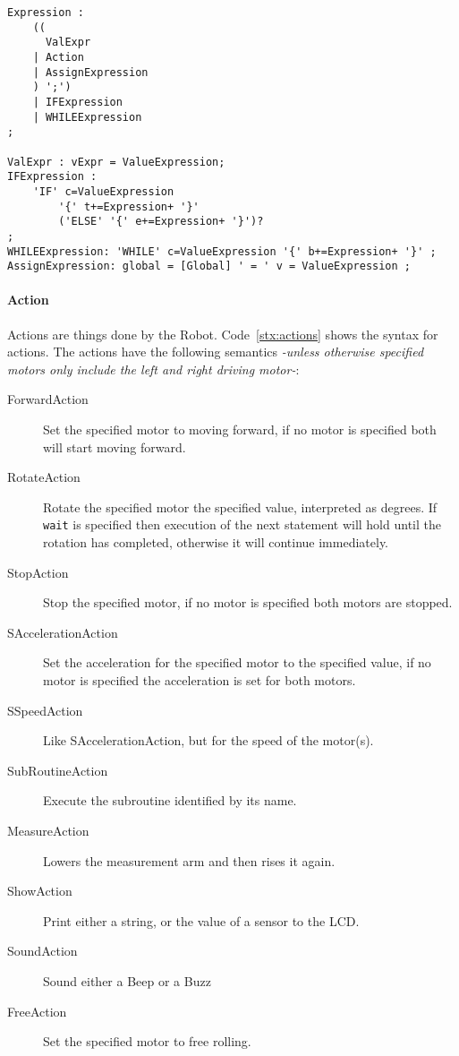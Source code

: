 \begin{lstlisting}[caption=Syntax for expressions, label=stx:expressions]
Expression : 
    ((
      ValExpr
    | Action
    | AssignExpression
    ) ';')
    | IFExpression
    | WHILEExpression
;

ValExpr : vExpr = ValueExpression;
IFExpression :
    'IF' c=ValueExpression 
        '{' t+=Expression+ '}' 
        ('ELSE' '{' e+=Expression+ '}')?
;
WHILEExpression: 'WHILE' c=ValueExpression '{' b+=Expression+ '}' ;
AssignExpression: global = [Global] ' = ' v = ValueExpression ;
\end{lstlisting}

\paragraph{Action}
Actions are things done by the Robot. Code~\ref{stx:actions} shows the syntax
for actions. The actions have the following semantics \textit{-unless otherwise 
specified motors only include the left and right driving motor-}:

\begin{description}
    \item[ForwardAction] Set the specified motor to moving forward, if no motor
            is specified both will start moving forward.
    \item[RotateAction] Rotate the specified motor the specified value, 
            interpreted as degrees. If \texttt{wait} is specified then execution
            of the next statement will hold until the rotation has completed,
            otherwise it will continue immediately.
    \item[StopAction] Stop the specified motor, if no motor is specified both 
            motors are stopped.
    \item[SAccelerationAction] Set the acceleration for the specified motor to
            the specified value, if no motor is specified the acceleration is 
            set for both motors.
    \item[SSpeedAction] Like SAccelerationAction, but for the speed of the 
            motor(s).
    \item[SubRoutineAction] Execute the subroutine identified by its name.
    \item[MeasureAction] Lowers the measurement arm and then rises it again. 
    \item[ShowAction] Print either a string, or the value of a sensor to the 
            LCD.
    \item[SoundAction] Sound either a Beep or a Buzz
    \item[FreeAction] Set the specified motor to free rolling. 
\end{description}

